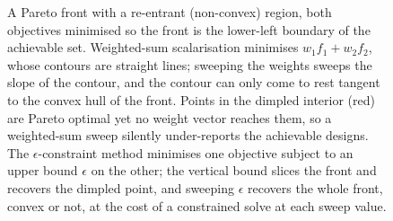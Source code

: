 \begin{figure}[ht]
\begin{tikzpicture}[x=1.15cm, y=1.15cm, font=\small]
\end{tikzpicture}
\caption[A non-convex Pareto front and the weighted-sum blind
spot]{A Pareto front with a re-entrant (non-convex) region, both
objectives minimised so the front is the lower-left boundary of the
achievable set. Weighted-sum scalarisation minimises $w_{1} f_{1} +
w_{2} f_{2}$, whose contours are straight lines; sweeping the weights
sweeps the slope of the contour, and the contour can only come to rest
tangent to the convex hull of the front. Points in the dimpled
interior (red) are Pareto optimal yet no weight vector reaches them,
so a weighted-sum sweep silently under-reports the achievable designs.
The $\epsilon$-constraint method minimises one objective subject to an
upper bound $\epsilon$ on the other; the vertical bound slices the
front and recovers the dimpled point, and sweeping $\epsilon$ recovers
the whole front, convex or not, at the cost of a constrained solve at
each sweep value.}
\label{fig:vol02:ch15:nonconvex-pareto}
\end{figure}
